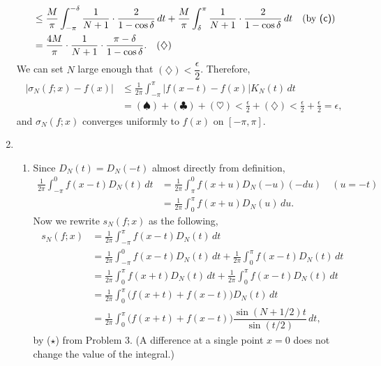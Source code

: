 \documentclass[12pt]{report}
\newcommand{\numl}[1]{\item[\large\textbf{\sffamily #1.}]}
\newcommand{\num}[1]{\item[\textbf{\sffamily #1}]}
\newcommand{\abs}[1]{\left| #1 \right|}
\renewcommand{\d}[1]{\,d{#1}}
\begin{document}
\begin{enumerate}
\[\begin{aligned}
                                       & \leq \frac{M}{\pi} \int_{-\pi}^{-\delta} \frac{1}{N+1}\cdot \frac{2}{1 - \cos\delta} \d{t} + \frac{M}{\pi} \int_{\delta}^\pi \frac{1}{N+1}\cdot \frac{2}{1 - \cos\delta} \d{t}  \quad (\text{by {\sffamily (c)}}) \\
                                       & = \frac{4M}{\pi} \cdot \frac{1}{N+1} \cdot \frac{\pi - \delta}{1 - \cos \delta}. \quad (\diamondsuit)
        \end{aligned}
    \]
    We can set \(N\) large enough that \((\diamondsuit) < \dfrac{\epsilon}{2}\). Therefore,
    \[
        \begin{aligned}
            \abs{\sigma_N(f; x) - f(x)} & \leq \frac{1}{2\pi} \int_{-\pi}^\pi \abs{f(x-t) - f(x)} K_N(t) \d{t}                                                                    \\
                                        & = (\spadesuit) + (\clubsuit) + (\heartsuit) < \frac{\epsilon}{2} + (\diamondsuit) < \frac{\epsilon}{2} + \frac{\epsilon}{2} = \epsilon,
        \end{aligned}
    \]
    and \(\sigma_N(f; x)\) converges uniformly to \(f(x)\) on \([-\pi, \pi]\).

    \numl{4}
    \begin{enumerate}
        \num{(a)} Since \(D_N(t) = D_N(-t)\) almost directly from definition,
        \[
            \begin{aligned}
                \frac{1}{2\pi} \int_{-\pi}^0 f(x-t) D_N(t)\d{t} & = \frac{1}{2\pi} \int_\pi^0 f(x + u) D_N(-u)(-du) \quad (u = -t) \\
                                                                & = \frac{1}{2\pi} \int_0^\pi f(x + u) D_N(u) \d{u}.
            \end{aligned}
        \]
        Now we rewrite \(s_N(f; x)\) as the following,
        \[
            \begin{aligned}
                s_N(f; x) & = \frac{1}{2\pi} \int_{-\pi}^\pi f(x- t) D_N(t)\d{t}                                              \\
                          & = \frac{1}{2\pi} \int_{-\pi}^0 f(x- t) D_N(t)\d{t} +\frac{1}{2\pi} \int_0^\pi f(x- t) D_N(t)\d{t} \\
                          & = \frac{1}{2\pi} \int_0^\pi f(x + t) D_N(t)\d{t} +\frac{1}{2\pi} \int_0^\pi f(x- t) D_N(t)\d{t}   \\
                          & = \frac{1}{2\pi} \int_0^\pi \bigl(f(x + t) + f(x- t)\bigr) D_N(t)\d{t}                            \\
                          & = \frac{1}{2\pi} \int_0^\pi \bigl(f(x + t) + f(x- t)\bigr) \dfrac{\sin(N+1/2)t}{\sin (t/2)}\d{t},
            \end{aligned}
        \]
        by (\(\star\)) from {\sffamily Problem 3}. (A difference at a single point \(x = 0\) does not change the value of the integral.)


\end{enumerate}
\end{enumerate}
\end{document}
